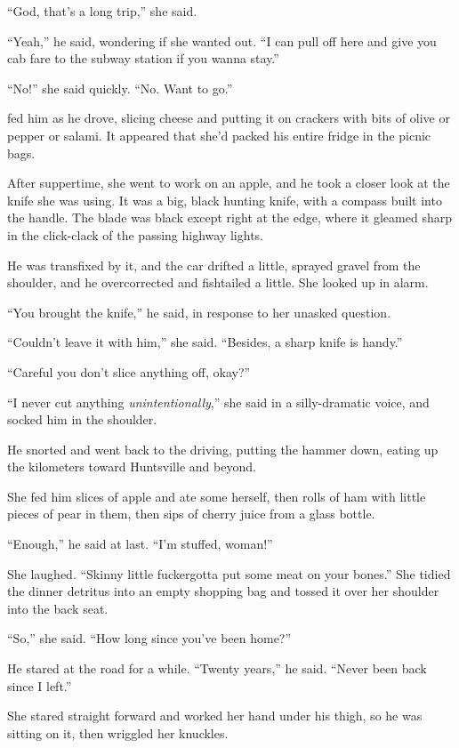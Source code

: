 ``God, that's a long trip,'' she said.

``Yeah,'' he said, wondering if she wanted out.  ``I can pull off here
and give you cab fare to the subway station if you wanna stay.''

``No!'' she said quickly.  ``No.  Want to go.''

 fed him as he drove, slicing cheese and putting it on crackers
with bits of olive or pepper or salami.  It appeared that she'd packed
his entire fridge in the picnic bags.

After suppertime, she went to work on an apple, and he took a closer
look at the knife she was using.  It was a big, black hunting knife,
with a compass built into the handle.  The blade was black except
right at the edge, where it gleamed sharp in the click-clack of the
passing highway lights.

He was transfixed by it, and the car drifted a little, sprayed gravel
from the shoulder, and he overcorrected and fishtailed a little.  She
looked up in alarm.

``You brought the knife,'' he said, in response to her unasked
question.

``Couldn't leave it with him,'' she said.  ``Besides, a sharp knife is
handy.''

``Careful you don't slice anything off, okay?''

``I never cut anything \textit{unintentionally},'' she said in a
silly-dramatic voice, and socked him in the shoulder.

He snorted and went back to the driving, putting the hammer down,
eating up the kilometers toward Huntsville and beyond.

She fed him slices of apple and ate some herself, then rolls of ham
with little pieces of pear in them, then sips of cherry juice from a
glass bottle.

``Enough,'' he said at last.  ``I'm stuffed, woman!''

She laughed.  ``Skinny little fucker\dash{}gotta put some meat on your
bones.'' She tidied the dinner detritus into an empty shopping bag and
tossed it over her shoulder into the back seat.

``So,'' she said.  ``How long since you've been home?''

He stared at the road for a while.  ``Twenty years,'' he said. 
``Never been back since I left.''

She stared straight forward and worked her hand under his thigh, so he
was sitting on it, then wriggled her knuckles.

